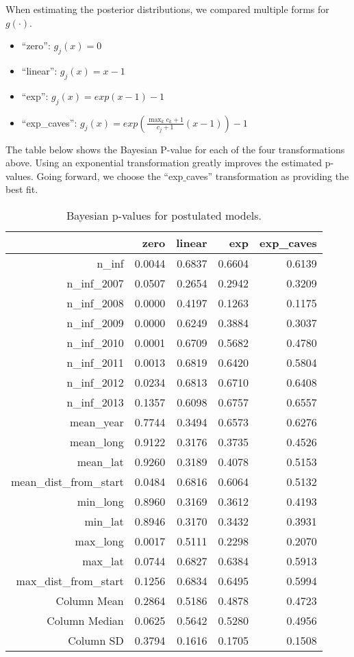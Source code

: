 \documentclass[11pt]{article}
\begin{document}
When estimating the posterior distributions, we compared multiple
forms for $g(\cdot)$.
\begin{itemize}
\item ``zero'': $g_j(x) = 0$
\item ``linear'': $g_j(x) = x - 1$
\item ``exp'': $g_j(x) = exp(x - 1) - 1$
\item ``exp\_caves'': $g_j(x) = exp(\frac{\max_k c_k+1}{c_j + 1}(x - 1)) - 1$
\end{itemize}


The table below shows the Bayesian P-value for each of the four
transformations above.  Using an exponential transformation greatly
improves the estimated p-values.  Going forward, we choose the
``exp\(\_\)caves'' transformation as providing the best fit.
\begin{table}[ht]
\centering
\begin{tabular}{rrrrr}
  & zero & linear & exp & exp\_caves \\ 
  \hline
n\_inf & 0.0044 & 0.6837 & 0.6604 & 0.6139 \\ 
  n\_inf\_2007 & 0.0507 & 0.2654 & 0.2942 & 0.3209 \\ 
  n\_inf\_2008 & 0.0000 & 0.4197 & 0.1263 & 0.1175 \\ 
  n\_inf\_2009 & 0.0000 & 0.6249 & 0.3884 & 0.3037 \\ 
  n\_inf\_2010 & 0.0001 & 0.6709 & 0.5682 & 0.4780 \\ 
  n\_inf\_2011 & 0.0013 & 0.6819 & 0.6420 & 0.5804 \\ 
  n\_inf\_2012 & 0.0234 & 0.6813 & 0.6710 & 0.6408 \\ 
  n\_inf\_2013 & 0.1357 & 0.6098 & 0.6757 & 0.6557 \\ 
  mean\_year & 0.7744 & 0.3494 & 0.6573 & 0.6276 \\ 
  mean\_long & 0.9122 & 0.3176 & 0.3735 & 0.4526 \\ 
  mean\_lat & 0.9260 & 0.3189 & 0.4078 & 0.5153 \\ 
  mean\_dist\_from\_start & 0.0484 & 0.6816 & 0.6064 & 0.5132 \\ 
  min\_long & 0.8960 & 0.3169 & 0.3612 & 0.4193 \\ 
  min\_lat & 0.8946 & 0.3170 & 0.3432 & 0.3931 \\ 
  max\_long & 0.0017 & 0.5111 & 0.2298 & 0.2070 \\ 
  max\_lat & 0.0744 & 0.6827 & 0.6384 & 0.5913 \\ 
  max\_dist\_from\_start & 0.1256 & 0.6834 & 0.6495 & 0.5994 \\ 
   \hline
Column Mean & 0.2864 & 0.5186 & 0.4878 & 0.4723 \\ 
  Column Median & 0.0625 & 0.5642 & 0.5280 & 0.4956 \\ 
  Column SD & 0.3794 & 0.1616 & 0.1705 & 0.1508 \\ 
   \hline
\end{tabular}
\caption{Bayesian p-values for postulated models.} 
\end{table}
\end{document}
